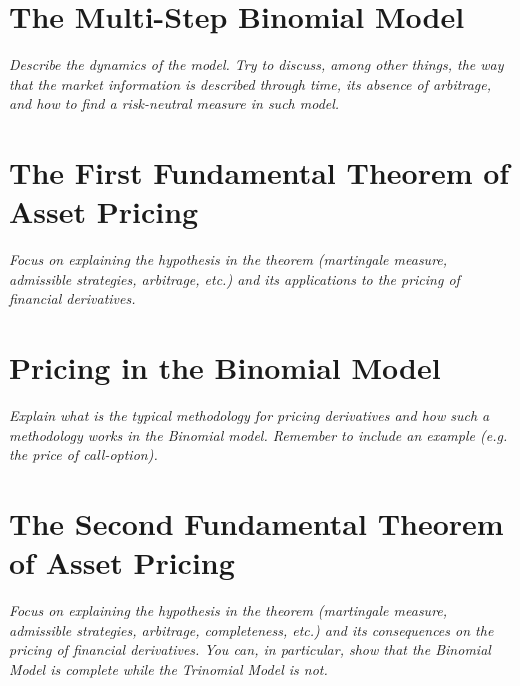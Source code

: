 \documentclass{article}
\theoremstyle{definition}
\numberwithin{equation}{section}
\begin{document}
\newpage

\section{The Multi-Step Binomial Model}
\textit{Describe the dynamics of the model. Try to discuss, among other things, the way that the market information is described through time, its absence of arbitrage, and how to find a risk-neutral measure in such model.}

\newpage

\section{The First Fundamental Theorem of Asset Pricing}
\textit{Focus on explaining the hypothesis in the theorem (martingale measure, admissible strategies, arbitrage, etc.) and its applications to the pricing of financial derivatives.}

\newpage

\section{Pricing in the Binomial Model}
\textit{Explain what is the typical methodology for pricing derivatives and how such a methodology works in the Binomial model. Remember to include an example (e.g. the price of call-option).}

\newpage

\section{The Second Fundamental Theorem of Asset Pricing}
\textit{Focus on explaining the hypothesis in the theorem (martingale measure, admissible strategies, arbitrage, completeness, etc.) and its consequences on the pricing of financial derivatives. You can, in particular, show that the Binomial Model is complete while the Trinomial Model is not.}
\end{document}
